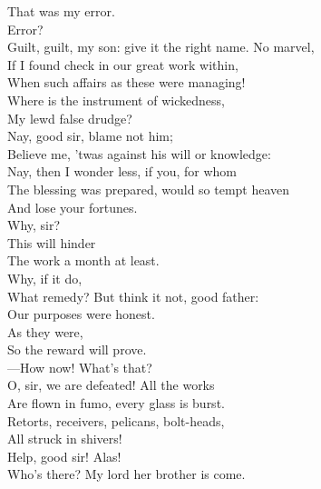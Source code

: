 \documentclass[a4paper,oneside,12pt]{memoir}
\begin{document}
\begin{drama*}
\mammonspeaks {} That was my error.\\
\subtlespeaks {} Error?\\
Guilt, guilt, my son: give it the right name. No marvel,\\
If I found check in our great work within,\\
When such affairs as these were managing!\\
Where is the instrument of wickedness,\\
My lewd false drudge?\\
\mammonspeaks {} Nay, good sir, blame not him;\\
Believe me, 'twas against his will or knowledge:\\
\subtlespeaks Nay, then I wonder less, if you, for whom\\
The blessing was prepared, would so tempt heaven\\
And lose your fortunes.\\
\mammonspeaks {} Why, sir?\\
\subtlespeaks {} This will hinder\\
The work a month at least.\\
\mammonspeaks {} Why, if it do,\\
What remedy? But think it not, good father:\\
Our purposes were honest.\\
\subtlespeaks {} As they were,\\
So the reward will prove.\\
 ---How now! What's that?\\
\facespeaks O, sir, we are defeated! All the works\\
Are flown in fumo, every glass is burst.\\
Retorts, receivers, pelicans, bolt-heads,\\
All struck in shivers!\\
 Help, good sir! Alas!\\
Who's there? My lord her brother is come.\\

\end{drama*}
\end{document}
